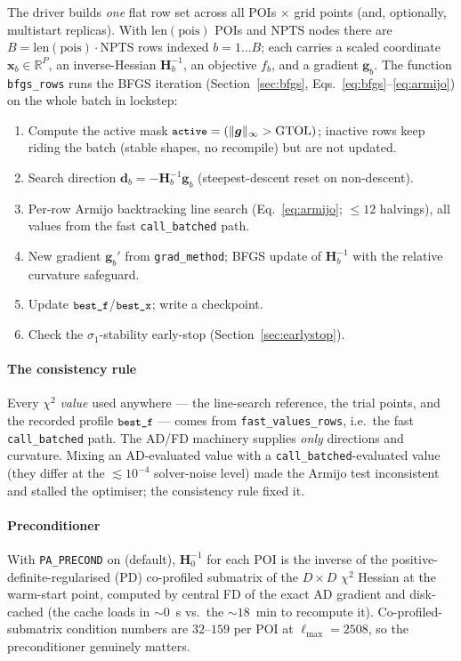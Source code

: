 \documentclass[11pt]{article}
\newcommand{\code}[1]{\texttt{\small #1}}
\newcommand{\chisq}{\chi^2}
\newcommand{\ginf}{\lVert \bm{g}\rVert_\infty}
\newcommand{\R}{\mathbb{R}}
\newcommand{\Lmax}{\ell_{\max}}
\begin{document}
The driver builds \emph{one} flat row set across all POIs $\times$ grid
points (and, optionally, multistart replicas). With $\mathrm{len(pois)}$
POIs and $\mathrm{NPTS}$ nodes there are
$B=\mathrm{len(pois)}\cdot\mathrm{NPTS}$ rows indexed $b=1\dots B$; each
carries a scaled coordinate $\bm x_b\in\R^P$, an inverse-Hessian
$\bm H^{-1}_b$, an objective $f_b$, and a gradient $\bm g_b$. The function
\code{bfgs\_rows} runs the BFGS iteration (Section~\ref{sec:bfgs},
Eqs.~\eqref{eq:bfgs}--\eqref{eq:armijo}) on the whole batch in lockstep:
\begin{enumerate}[leftmargin=2em,itemsep=1pt]
\item Compute the active mask $\code{active}=(\ginf>\mathrm{GTOL})$;
inactive rows keep riding the batch (stable shapes, no recompile) but are
not updated.
\item Search direction $\bm d_b=-\bm H^{-1}_b\bm g_b$ (steepest-descent
reset on non-descent).
\item Per-row Armijo backtracking line search
(Eq.~\eqref{eq:armijo}; $\le12$ halvings), all values from the fast
\code{call\_batched} path.
\item New gradient $\bm g_b'$ from \code{grad\_method}; BFGS update of
$\bm H^{-1}_b$ with the relative curvature safeguard.
\item Update $\code{best\_f}$/$\code{best\_x}$; write a checkpoint.
\item Check the $\sigma_1$-stability early-stop (Section~\ref{sec:earlystop}).
\end{enumerate}

\paragraph{The consistency rule}
\label{sec:consistency}
Every $\chisq$ \emph{value} used anywhere --- the line-search reference,
the trial points, and the recorded profile $\code{best\_f}$ --- comes
from \code{fast\_values\_rows}, i.e.\ the fast \code{call\_batched} path.
The AD/FD machinery supplies \emph{only} directions and curvature. Mixing
an AD-evaluated value with a \code{call\_batched}-evaluated value (they
differ at the $\lesssim10^{-4}$ solver-noise level) made the Armijo test
inconsistent and stalled the optimiser; the consistency rule fixed it.

\paragraph{Preconditioner}
With \code{PA\_PRECOND} on (default), $\bm H^{-1}_0$ for each POI is the
inverse of the positive-definite-regularised (PD) co-profiled submatrix of the $D\times D$
$\chisq$ Hessian at the warm-start point, computed by central FD of the
exact AD gradient and disk-cached (the cache loads in $\sim0$~s vs.\ the
$\sim18$~min to recompute it). Co-profiled-submatrix condition numbers are
$32$--$159$ per POI at $\Lmax=2508$, so the preconditioner genuinely
matters.
\end{document}

